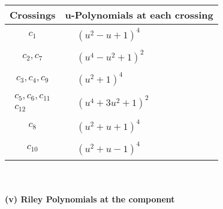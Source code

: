 \documentclass[1p]{elsarticle_modified}
\theoremstyle{definition}
\begin{document}
\begin{tabular}{m{50pt}|m{274pt}}
Crossings & \hspace{64pt}u-Polynomials at each crossing \\
\hline $$\begin{aligned}c_{1}\end{aligned}$$&$\begin{aligned}
&(u^2- u+1)^4
\end{aligned}$\\
\hline $$\begin{aligned}c_{2},c_{7}\end{aligned}$$&$\begin{aligned}
&(u^4- u^2+1)^2
\end{aligned}$\\
\hline $$\begin{aligned}c_{3},c_{4},c_{9}\end{aligned}$$&$\begin{aligned}
&(u^2+1)^4
\end{aligned}$\\
\hline $$\begin{aligned}c_{5},c_{6},c_{11}\\c_{12}\end{aligned}$$&$\begin{aligned}
&(u^4+3 u^2+1)^2
\end{aligned}$\\
\hline $$\begin{aligned}c_{8}\end{aligned}$$&$\begin{aligned}
&(u^2+u+1)^4
\end{aligned}$\\
\hline $$\begin{aligned}c_{10}\end{aligned}$$&$\begin{aligned}
&(u^2+u-1)^4
\end{aligned}$\\
\hline
\end{tabular}\\~\\
\newpage\renewcommand{\arraystretch}{1}
\flushleft \textbf{(v) Riley Polynomials at the component}\newline \\
\end{document}
